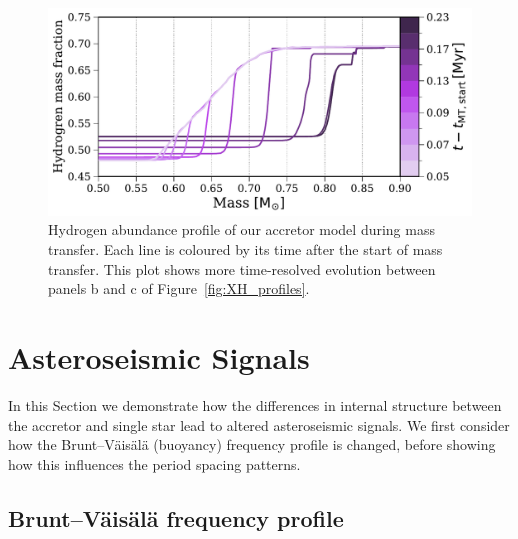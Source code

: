 \documentclass[desactivate]{aa}
\begin{document}
\begin{figure}[tb]
    \centering
    \includegraphics[width=\columnwidth]{figures/XH_profile_zoom_MT.pdf}
    \caption{Hydrogen abundance profile of our accretor model during mass transfer. Each line is coloured by its time after the start of mass transfer. This plot shows more time-resolved evolution between panels b and c of Figure~\ref{fig:XH_profiles}.}
    \label{fig:X_H_zoom_MT}
\end{figure}

\section{Asteroseismic Signals} \label{sec:asteroseismic}

In this Section we demonstrate how the differences in internal structure between the accretor and single star lead to altered asteroseismic signals. We first consider how the Brunt–Väisälä (buoyancy) frequency profile is changed, before showing how this influences the period spacing patterns.

\subsection{Brunt–Väisälä frequency profile}\label{sec:bvf}
\end{document}
